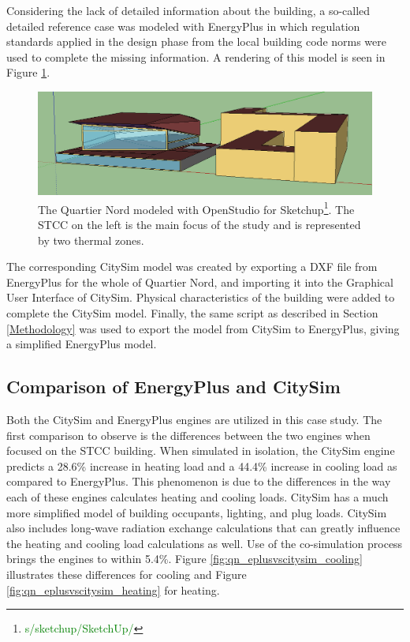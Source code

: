 \documentclass{tBPS2e}
\theoremstyle{plain}
\theoremstyle{definition}
\theoremstyle{remark}
\newcommand{\noteDT}[1]{\footnote{\textcolor{green}{#1}}}
\begin{document}
Considering the lack of detailed information about the building, a so-called
detailed reference case was modeled with EnergyPlus \citep{mauree_evaluation_2015} in
which regulation standards applied in the design phase from the local building code norms were
used to complete the missing information. A rendering of this model is seen in
Figure \ref{fig:model_yang}.

\begin{figure}[H]
\centering
\includegraphics[width=\textwidth]{figures/model_yang}
\caption{The Quartier Nord modeled with OpenStudio for
Sketchup\noteDT{s/sketchup/SketchUp/}. The STCC on the left is the main focus
of the study and is represented by two thermal zones.}
\label{fig:model_yang}
\end{figure}

The corresponding CitySim model was created by exporting a DXF file from
EnergyPlus for the whole of Quartier Nord, and importing 
it into the Graphical User Interface of CitySim.
Physical characteristics of the building were added to complete the CitySim
model. Finally, the same script as described in Section \ref{Methodology} was
used to export the model from CitySim to EnergyPlus, giving a simplified
EnergyPlus model.\\

\subsection{Comparison of EnergyPlus and CitySim}

Both the CitySim and EnergyPlus engines are utilized in this case study. The
first comparison to observe is the differences between the two engines when
focused on the STCC building. When simulated in isolation, the
CitySim engine predicts a 28.6\% increase in heating load and a 44.4\%
increase in cooling load as compared to EnergyPlus. This phenomenon is due to
the differences in the way each of these engines calculates heating and
cooling loads. CitySim has a much more simplified model of building occupants,
lighting, and plug loads. CitySim also includes long-wave radiation exchange calculations
that can greatly influence the heating and cooling load calculations as well.
 Use of the co-simulation process brings the engines to within
5.4\%. Figure \ref{fig:qn_eplusvscitysim_cooling} illustrates these
differences for cooling and Figure \ref{fig:qn_eplusvscitysim_heating} for
heating.
\end{document}
